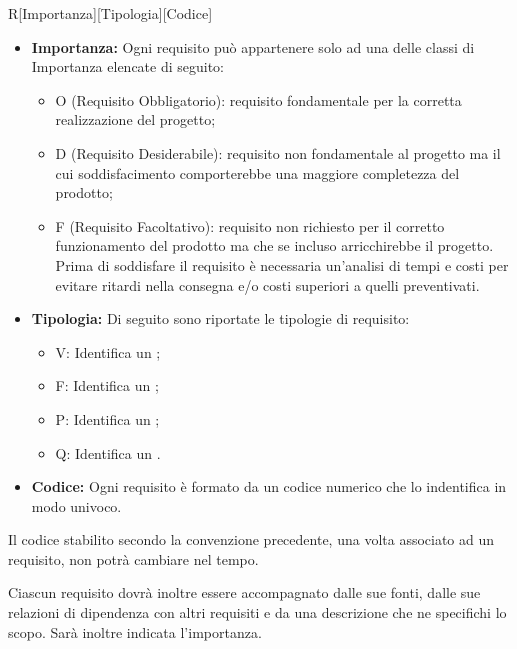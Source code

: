 \documentclass[../NomeDocumento.tex]{subfiles}
\begin{document}
	\centerline{R[Importanza][Tipologia][Codice]}
	
		\begin{itemize}
			\item \textbf{Importanza:} Ogni requisito può appartenere solo ad una delle classi di Importanza elencate di seguito:
			\begin{itemize}
				\item O (Requisito Obbligatorio): requisito fondamentale per la corretta realizzazione del progetto;
				\item D (Requisito Desiderabile): requisito non fondamentale al progetto ma il cui soddisfacimento comporterebbe una maggiore completezza del prodotto;
				\item F (Requisito Facoltativo): requisito non richiesto per il corretto funzionamento del prodotto ma che se incluso arricchirebbe il progetto. Prima di soddisfare il requisito è necessaria un’analisi di tempi e costi per evitare ritardi nella consegna e/o costi superiori a quelli preventivati.
			\end{itemize}
			\item \textbf{Tipologia:} Di seguito sono riportate le tipologie di requisito:
			\begin{itemize}
				\item V: Identifica un ;
				\item F: Identifica un ;
				\item P: Identifica un ;
				\item Q: 
				Identifica un .
			\end{itemize}
		\item \textbf{Codice:} Ogni requisito è formato da un codice numerico che lo indentifica in modo univoco.
		\end{itemize}
	
	Il codice stabilito secondo la convenzione precedente, una volta associato ad un requisito, non potrà cambiare nel tempo.
	
	Ciascun requisito dovrà inoltre essere accompagnato dalle sue fonti, dalle sue relazioni di dipendenza con altri requisiti e da una descrizione che ne specifichi lo scopo. Sarà inoltre indicata l'importanza.
	
	
		
\end{document}
